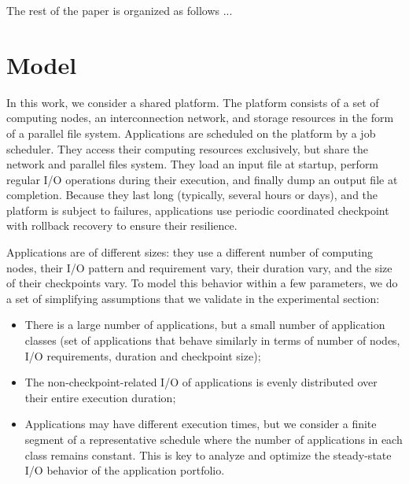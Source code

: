 \documentclass[conference]{IEEEtran}
\begin{document}
The rest of the paper is organized as follows ...

\section{Model}
\label{sec:model}


In this work, we consider a shared platform. The platform consists of
a set of computing nodes, an interconnection network, and storage
resources in the form of a parallel file system. Applications are
scheduled on the platform by a job scheduler. They access their
computing resources exclusively, but share the network and parallel
files system. They load an input file at startup, perform regular I/O operations during their
execution, and finally dump an output file at
completion. Because they last long (typically, several hours or days), and the platform is
subject to failures, applications use periodic coordinated checkpoint with
rollback recovery to ensure their resilience.

Applications are of different sizes: they use a different number of
computing nodes, their I/O pattern and requirement vary, their
duration vary, and the size of their checkpoints vary. To model this
behavior within a few parameters, we do a set of simplifying assumptions
that we validate in the experimental section:
\begin{itemize}
  \item There is a large number of applications, but a small number of
    application classes (set of applications that behave similarly in
    terms of number of nodes, I/O requirements, duration and
    checkpoint size);
  \item The non-checkpoint-related I/O of applications is evenly distributed
    over their entire execution duration;
  \item Applications may have different execution times, but we consider a finite
    segment of a representative schedule where the number of applications in each class remains constant. This is key to analyze and optimize the steady-state I/O behavior of the
    application portfolio.
\end{itemize}
\end{document}
